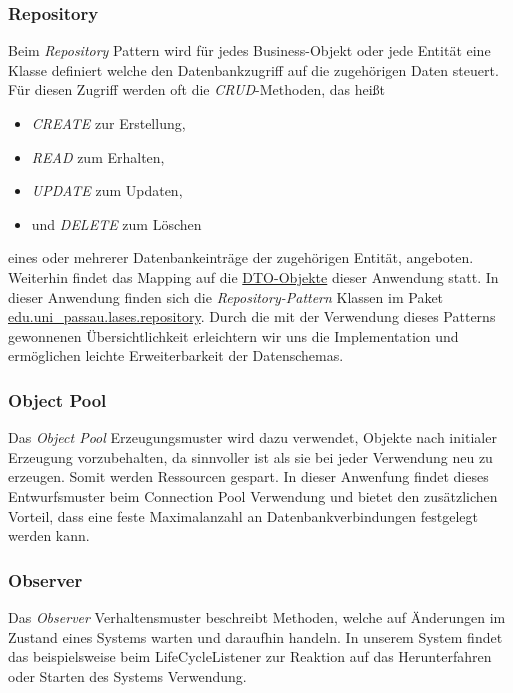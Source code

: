 \subsubsection{Repository}
Beim \emph{Repository} Pattern wird für jedes Business-Objekt oder jede Entität
eine Klasse definiert welche den Datenbankzugriff auf die zugehörigen Daten steuert.
Für diesen Zugriff werden oft die \textit{CRUD}-Methoden, das heißt
\begin{itemize}
    \item \textit{CREATE} zur Erstellung,
    \item \textit{READ} zum Erhalten,
    \item \textit{UPDATE} zum Updaten,
    \item und \textit{DELETE} zum Löschen
\end{itemize}
eines oder mehrerer Datenbankeinträge der zugehörigen Entität, angeboten.
Weiterhin findet das Mapping auf die \hyperref[arch:transport]{DTO-Objekte} dieser Anwendung statt.
In dieser Anwendung finden sich die \emph{Repository-Pattern} Klassen im Paket
\hyperref[arch:repository]{edu.uni\_passau.lases.repository}. Durch die mit
der Verwendung dieses Patterns gewonnenen Übersichtlichkeit erleichtern wir uns die
Implementation und ermöglichen leichte Erweiterbarkeit der Datenschemas.

\subsubsection{Object Pool}
Das \emph{Object Pool} Erzeugungsmuster wird dazu verwendet, Objekte nach initialer Erzeugung
vorzubehalten, da sinnvoller ist als sie bei jeder Verwendung neu zu erzeugen.
Somit werden Ressourcen gespart. In dieser Anwenfung findet dieses Entwurfsmuster
beim Connection Pool %
Verwendung und bietet den zusätzlichen Vorteil, dass eine feste Maximalanzahl an
Datenbankverbindungen festgelegt werden kann.

\subsubsection{Observer}
Das \emph{Observer} Verhaltensmuster beschreibt Methoden, welche auf
Änderungen im Zustand eines Systems warten und daraufhin handeln.
In unserem System findet das beispielsweise beim LifeCycleListener %
zur Reaktion auf das Herunterfahren oder Starten des Systems Verwendung.
